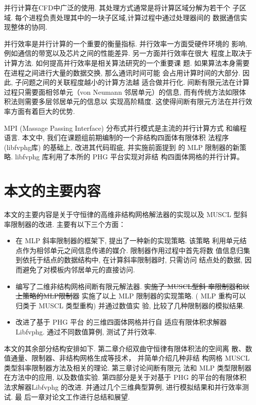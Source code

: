并行计算在CFD中广泛的使用. 其处理方式通常是将计算区域分解为若干个
子区域. 每个进程负责处理其中的一块子区域,计算过程中通过处理器间的
数据通信实现整体的协同.

并行效率是并行计算的一个重要的衡量指标. 并行效率一方面受硬件环境的
影响, 例如通信的带宽以及芯片之间的性能差异. 另一方面并行效率在很大
程度上取决于计算方法. 如何提高并行效率是相关算法研究的一个重要课
题. 如果算法本身需要在进程之间进行大量的数据交换, 那么通讯时间可能
会占用计算时间的大部分. 因此, 子问题之间的关联程度越小的计算方法越
适合做并行化. 间断有限元法在计算过程只需要面相邻单元（von Neumann
邻居单元）的信息, 而有传统方法如限体积法则需要多层邻居单元的信息以
实现高阶精度. 这使得间断有限元方法在并行效率方面有着巨大的优势.

MPI (Massage Passing Interface) 分布式并行模式是主流的并行计算方式
和编程语言. 本文中, 我们在课题组前期编制的一个非结构四面体有限体积
法程序 (libfvphg库) 的基础上, 改进其代码瑕疵, 并实施前面提到
的 MLP 限制器的新策略. libfvphg 库利用了本所的 PHG 平台实现对非结
构四面体网格的并行计算。


\section{本文的主要内容}
\label{sec:main-containt}

本文的主要内容是关于守恒律的高维非结构网格解法器的实现以及 MUSCL
型斜率限制器的改进. 主要有以下三个方面：
\begin{itemize}
\item 在 MLP 斜率限制器的框架下, 提出了一种新的实现策略. 该策略
  利用单元结点作为相邻单元之间信息传递的媒介. 限制器作用过程中首先将数
  值信息归集到依托于结点的数据结构中, 在计算斜率限制器时, 只需访问
  结点处的数据, 因而避免了对模板内邻居单元的直接访问.
\item 编写了二维非结构网格间断有限元解法器. \sout{实施了 MUSCL型斜
    率限制器和以上策略的MLP限制器} 实施了以上 MLP 限制器的实现策略.
  ({\color{blue} MLP 重构可以归类于 MUSCL 类型重构}) 并通过数值实
  验, 比较了几种限制器的模拟结果.
\item 改进了基于 PHG 平台 \cite{Zhang2009} 的三维四面体网格并行自
  适应有限体积求解器 Libfvphg. 通过不同数值算例, 测试了并行效率.
\end{itemize}

本文的其余部分结构安排如下. 第二章介绍双曲守恒律有限体积法的空间离
散、数值通量、限制器、非结构网格生成等技术， 并简单介绍几种非结
构网格 MUSCL 类型斜率限制器方法及相关的理论. 第三章讨论间断有限元
法和 MLP 类型限制器在方法中的应用, 以及数值实验. 第四部分是关于对基于 PHG 的平台的有限体积
法求解器Libfvphg 的改进. 并通过几个三维典型算例, 进行模拟结果和并行效率测试. 最
后一章对论文工作进行总结和展望.
